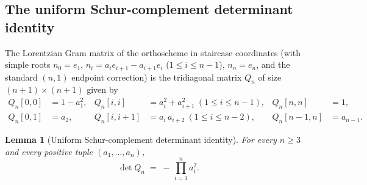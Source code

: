 \documentclass[11pt,a4paper]{article}
\newtheorem{lemma}[theorem]{Lemma}
\theoremstyle{remark}
\theoremstyle{plain}
\begin{document}
\subsection{The uniform Schur-complement determinant identity}

The Lorentzian Gram matrix of the orthoscheme in staircase
coordinates (with simple roots $n_0 = e_1$,
$n_i = a_i e_{i+1} - a_{i+1} e_i$ ($1 \le i \le n-1$), $n_n = e_n$,
and the standard $(n, 1)$ endpoint correction) is the tridiagonal
matrix $Q_n$ of size $(n+1) \times (n+1)$ given by
\begin{align*}
Q_n[0,0] &= 1 - a_1^2, & Q_n[i,i] &= a_i^2 + a_{i+1}^2\ (1 \le i \le n-1),
& Q_n[n,n] &= 1, \\
Q_n[0,1] &= a_2, & Q_n[i,i+1] &= a_i\, a_{i+2}\ (1 \le i \le n-2),
& Q_n[n-1,n] &= a_{n-1}.
\end{align*}

\begin{lemma}[Uniform Schur-complement determinant identity]
\label{lem:uniform-detQ}
For every $n \ge 3$ and every positive tuple $(a_1, \ldots, a_n)$,
\[
\det Q_n  \;=\;  -\, \prod_{i=1}^{n} a_i^2.
\]
\end{lemma}
\end{document}
